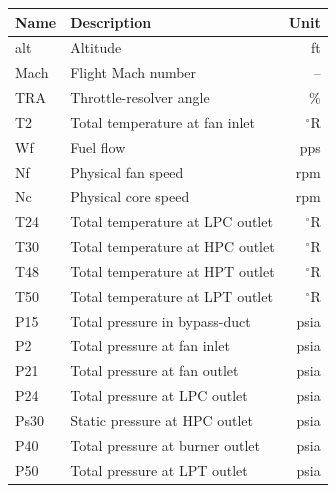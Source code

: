 \begin{tabular}{llr}
\toprule
Name & Description & Unit \\
\midrule
alt  & Altitude & ft \\
Mach & Flight Mach number & -- \\
TRA  & Throttle-resolver angle & \% \\
T2   & Total temperature at fan inlet & $^\circ$R \\
\midrule
Wf   & Fuel flow & pps \\
Nf   & Physical fan speed & rpm \\
Nc   & Physical core speed & rpm \\
T24  & Total temperature at LPC outlet & $^\circ$R \\
T30  & Total temperature at HPC outlet & $^\circ$R \\
T48  & Total temperature at HPT outlet & $^\circ$R \\
T50  & Total temperature at LPT outlet & $^\circ$R \\
P15  & Total pressure in bypass-duct & psia \\
P2   & Total pressure at fan inlet & psia \\
P21  & Total pressure at fan outlet & psia \\
P24  & Total pressure at LPC outlet & psia \\
Ps30 & Static pressure at HPC outlet & psia \\
P40  & Total pressure at burner outlet & psia \\
P50  & Total pressure at LPT outlet & psia \\
\bottomrule
\end{tabular}
